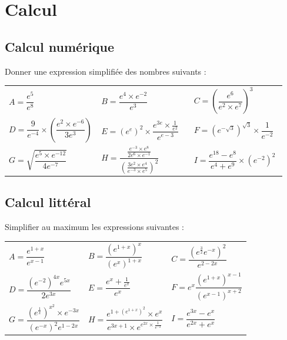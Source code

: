 \documentclass[oneside,12pt]{article}          %
\begin{document}
\section{Calcul}


\subsection{Calcul numérique}
Donner une expression simplifiée des nombres suivants :

\renewcommand{\arraystretch}{2.4}
\begin{tabular}{p{0.33\linewidth}p{0.33\linewidth}p{0.33\linewidth}}
    $A = \dfrac{e^5}{e^8}$ & $B = \dfrac{e^4\times e^{-2}}{e^3}$ & $C = \left(\dfrac{e^6}{e^2\times e^7}\right)^3$\\
    $D = \dfrac{9}{e^{-4}}\times\left(\dfrac{e^2\times e^{-6}}{3e^3}\right)$ & $E = \left(e^e\right)^2\times\dfrac{e^{3e}\times\frac{1}{e^2}}{e^{e-3}}$ & $F = \left(e^{-\sqrt{3}}\right)^{\sqrt{3}}\times\dfrac{1}{e^{-2}}$\\
    $G = \sqrt{\dfrac{e^5\times e^{-12}}{4e^{-7}}}$ & $H = \dfrac{\frac{e^{-3}\times e^8}{2e^6\times e^{-1}}}{\left(\frac{3e^2\times e^4}{e^{-3}\times e^5}\right)^2}$ & $I = \dfrac{e^{18}-e^{8}}{e^4+e^9}\times \left(e^{-2}\right)^2$
\end{tabular}



\subsection{Calcul littéral}
Simplifier au maximum les expressions suivantes :

\renewcommand{\arraystretch}{2.4}
\begin{tabular}{p{} p{} p{}}\large

    $A=\dfrac{e^{1+x}}{e^{x-1}}$ & $B=\dfrac{(e^{1+x})^{x}}{(e^{x})^{1+x}}$ & $C=\dfrac{(e^{\frac{3}{2}}e^{-x})^{2}}{e^{2-2x}}$ \\
    $D=\dfrac{(e^{-2})^{4x}e^{5x}}{2e^{3x}} $ & $E=\dfrac{e^{x}+\frac{1}{e^{x}}}{e^{x}} $ & $F=e^{x}\dfrac{(e^{1+x})^{x-1}}{(e^{x-1})^{x+2}} $ \\
    $G=\dfrac{\left(e^{\frac{1}{x}}\right)^{x^{2}}\times e^{-3x}}{(e^{-x})^{2}e^{1-2x}}$ & $H=\dfrac{e^{1+(e^{1+x})^{2}}\times e^{x}}{e^{3x+1}\times e^{e^{2x}\times\frac{1}{e^{-2}}}}$ & $I=\dfrac{e^{3x}-e^{x}}{e^{2x}+e^{x}} $
\end{tabular}
\end{document}
